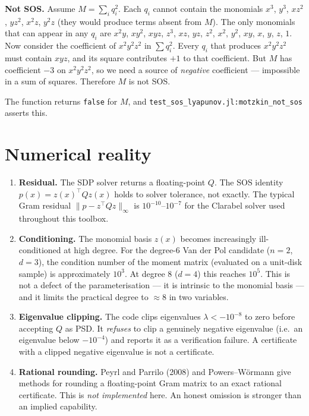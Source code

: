 \documentclass[11pt]{article}
\begin{document}
\medskip\noindent\textbf{Not SOS.} Assume $M = \sum_i q_i^2$. Each $q_i$
cannot contain the monomials $x^3$, $y^3$, $x z^2$, $y z^2$, $x^2 z$, $y^2 z$
(they would produce terms absent from $M$). The only monomials that can
appear in any $q_i$ are $x^2 y$, $x y^2$, $x y z$, $z^3$, $x z$, $y z$,
$z^2$, $x^2$, $y^2$, $x y$, $x$, $y$, $z$, $1$. Now consider the coefficient
of $x^2 y^2 z^2$ in $\sum q_i^2$. Every $q_i$ that produces $x^2 y^2 z^2$
must contain $x y z$, and its square contributes $+1$ to that coefficient.
But $M$ has coefficient $-3$ on $x^2 y^2 z^2$, so we need a source of
\emph{negative} coefficient --- impossible in a sum of squares. Therefore
$M$ is not SOS.

The function  returns
\texttt{false} for $M$, and \texttt{test\_sos\_lyapunov.jl:motzkin\_not\_sos}
asserts this.

\section{Numerical reality}
\begin{enumerate}
  \item \textbf{Residual.} The SDP solver returns a floating-point $Q$.
    The SOS identity $p(x) = z(x)^\top Q z(x)$ holds to solver tolerance,
    not exactly. The typical Gram residual
    $\|p - z^\top Q z\|_\infty$ is $10^{-10}$--$10^{-7}$ for the Clarabel
    solver used throughout this toolbox.
  \item \textbf{Conditioning.} The monomial basis $z(x)$ becomes
    increasingly ill-conditioned at high degree. For the degree-6 Van der
    Pol candidate ($n=2$, $d=3$), the condition number of the moment
    matrix (evaluated on a unit-disk sample) is approximately $10^3$. At
    degree 8 ($d=4$) this reaches $10^5$. This is not a defect of the
    parameterisation --- it is intrinsic to the monomial basis --- and it
    limits the practical degree to $\approx 8$ in two variables.
  \item \textbf{Eigenvalue clipping.} The code clips eigenvalues
    $\lambda < -10^{-8}$ to zero before accepting $Q$ as PSD. It
    \emph{refuses} to clip a genuinely negative eigenvalue (i.e.~an
    eigenvalue below $-10^{-4}$) and reports it as a verification failure.
    A certificate with a clipped negative eigenvalue is not a certificate.
  \item \textbf{Rational rounding.} Peyrl and Parrilo (2008) and
    Powers--W\"ormann give methods for rounding a floating-point Gram
    matrix to an exact rational certificate. This is \emph{not implemented}
    here. An honest omission is stronger than an implied capability.
\end{enumerate}
\end{document}
